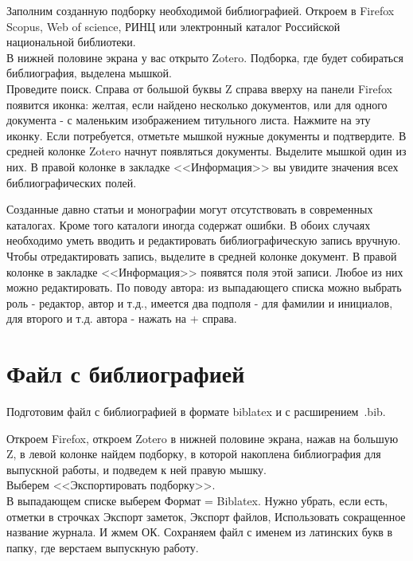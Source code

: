 Заполним созданную подборку необходимой библиографией. Откроем в Firefox Scopus, Web of science, РИНЦ или электронный каталог Российской национальной библиотеки.\\
В нижней половине экрана у вас открыто Zotero. Подборка, где будет собираться библиография, выделена мышкой.\\
Проведите поиск. Справа от большой буквы Z справа вверху на панели Firefox появится иконка: желтая, если найдено несколько документов, или для одного документа - с маленьким изображением титульного листа. Нажмите на эту иконку. Если потребуется, отметьте мышкой нужные документы и подтвердите. В средней колонке Zotero начнут появляться документы. Выделите мышкой один из них. В правой колонке в закладке <<Информация>> вы увидите значения всех библиографических полей.

Созданные давно статьи и монографии могут отсутствовать в современных каталогах. Кроме того каталоги иногда содержат ошибки. В обоих случаях необходимо уметь вводить и редактировать библиографическую запись вручную. Чтобы отредактировать запись, выделите в средней колонке документ. В правой колонке в закладке <<Информация>> появятся поля этой записи. Любое из них можно редактировать. По поводу автора: из выпадающего списка можно выбрать роль - редактор, автор и т.д., имеется два подполя - для фамилии и инициалов, для второго и т.д.  автора - нажать на + справа.

 
 \section{Файл с библиографией}
 
 Подготовим файл с библиографией в формате biblatex и с расширением~.bib.
 
 Откроем Firefox,  откроем Zotero в нижней половине экрана, нажав на большую Z,  в левой колонке найдем подборку, в которой накоплена библиография для выпускной работы, и подведем к ней правую мышку.\\
 Выберем <<Экспортировать подборку>>.\\
В выпадающем списке выберем Формат = Biblatex. Нужно убрать, если есть, отметки в строчках Экспорт заметок, Экспорт файлов, Использовать сокращенное название журнала. И жмем ОК. Сохраняем файл с именем из латинских букв в папку, где верстаем выпускную работу.

